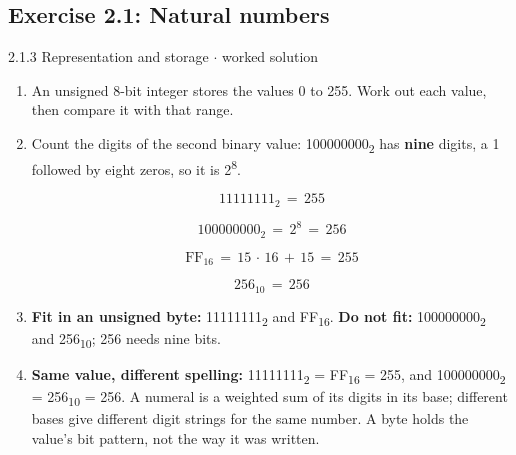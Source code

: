 \documentclass[11pt]{article}
\begin{document}
\begin{keepsection}\subsection{Exercise 2.1: Natural numbers}

\begin{workedbox}{2.1.3 Representation and storage \ensuremath{\cdot} worked solution}
\begin{enumerate}
\item An unsigned 8-bit integer stores the values 0 to 255. Work out each value, then compare it with that range.
\item {}
Count the digits of the second binary value: 100000000\textsubscript{2} has \textbf{nine} digits, a 1 followed by eight zeros, so it is 2\textsuperscript{8}.

\begin{equation*}11111111_{2}\, =\, 255\end{equation*}

\begin{equation*}100000000_{2}\, =\, 2^{8}\, =\, 256\end{equation*}

\begin{equation*}\text{FF}_{16}\, =\, 15\, \cdot \, 16\, +\, 15\, =\, 255\end{equation*}

\begin{equation*}256_{10}\, =\, 256\end{equation*}
\item \textbf{Fit in an unsigned byte:} 11111111\textsubscript{2} and FF\textsubscript{16}. \textbf{Do not fit:} 100000000\textsubscript{2} and 256\textsubscript{10}; 256 needs nine bits.
\item \textbf{Same value, different spelling:} 11111111\textsubscript{2} = FF\textsubscript{16} = 255, and 100000000\textsubscript{2} = 256\textsubscript{10} = 256. A numeral is a weighted sum of its digits in its base; different bases give different digit strings for the same number. A byte holds the value's bit pattern, not the way it was written.
\end{enumerate}
\end{workedbox}

\end{keepsection}
\end{document}
